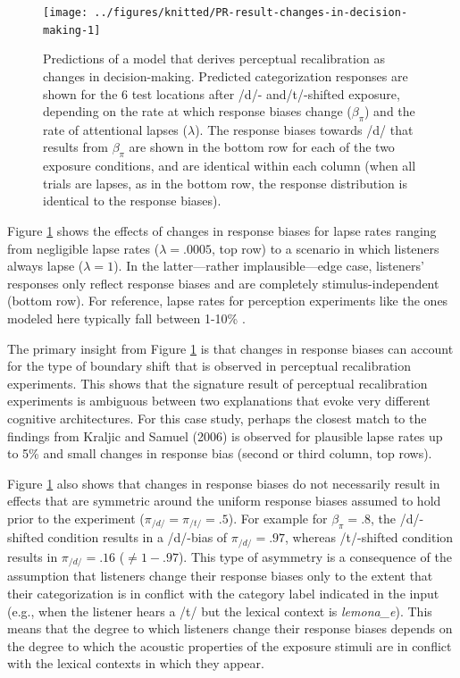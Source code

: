 \documentclass[
  11pt,
  man,floatsintext]{apa6}
\begin{document}
\begin{figure}

{\centering \texttt{[image: ../figures/knitted/PR-result-changes-in-decision-making-1]} 

}

\caption{Predictions of a model that derives perceptual recalibration as changes in decision-making. Predicted categorization responses are shown for the 6 test locations after /d/- and/t/-shifted exposure, depending on the rate at which response biases change (\(\beta_{\pi}\)) and the rate of attentional lapses (\(\lambda\)). The response biases towards /d/ that results from \(\beta_{\pi}\) are shown in the bottom row for each of the two exposure conditions, and are identical within each column (when all trials are lapses, as in the bottom row, the response distribution is identical to the response biases).}\label{fig:PR-result-changes-in-decision-making}
\end{figure}

Figure \ref{fig:PR-result-changes-in-decision-making} shows the effects of changes in response biases for lapse rates ranging from negligible lapse rates (\(\lambda = .0005\), top row) to a scenario in which listeners always lapse (\(\lambda = 1\)). In the latter---rather implausible---edge case, listeners' responses only reflect response biases and are completely stimulus-independent (bottom row). For reference, lapse rates for perception experiments like the ones modeled here typically fall between 1-10\% \autocites[e.g.,][ constrained lapse rates to be \(<5\)\%]{clayards2008}[ report a best-fitting value of 5\%]{kleinschmidt-jaeger2016cogsci}.

The primary insight from Figure \ref{fig:PR-result-changes-in-decision-making} is that changes in response biases can account for the type of boundary shift that is observed in perceptual recalibration experiments. This shows that the signature result of perceptual recalibration experiments is ambiguous between two explanations that evoke very different cognitive architectures. For this case study, perhaps the closest match to the findings from Kraljic and Samuel (2006) is observed for plausible lapse rates up to 5\% and small changes in response bias (second or third column, top rows).

Figure \ref{fig:PR-result-changes-in-decision-making} also shows that changes in response biases do not necessarily result in effects that are symmetric around the uniform response biases assumed to hold prior to the experiment (\(\pi_{/d/}=\pi_{/t/}=.5\)). For example for \(\beta_{\pi} = .8\), the /d/-shifted condition results in a /d/-bias of \(\pi_{/d/}=.97\), whereas /t/-shifted condition results in \(\pi_{/d/}=.16\) (\(\neq 1 - .97\)). This type of asymmetry is a consequence of the assumption that listeners change their response biases only to the extent that their categorization is in conflict with the category label indicated in the input (e.g., when the listener hears a /t/ but the lexical context is \emph{lemona\_e}). This means that the degree to which listeners change their response biases depends on the degree to which the acoustic properties of the exposure stimuli are in conflict with the lexical contexts in which they appear.
\end{document}
